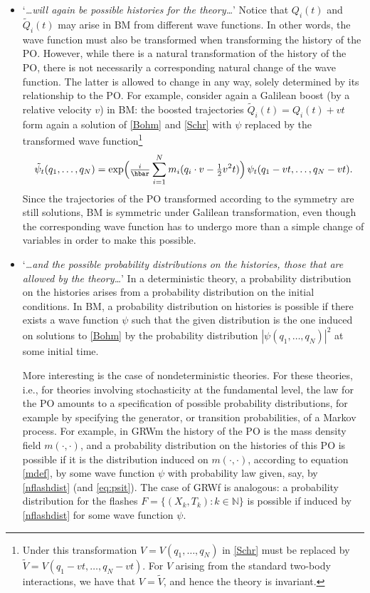 \documentclass[12pt]{article}
\newcommand{\NNN}{\mathbb{N}}
\begin{document}
\begin{itemize}
\item  `{\em \ldots  will again be possible histories for the theory\ldots}'
Notice that $Q_i(t)$ and $\tilde{Q}_i(t)$ may {arise in {\sf BM} from} different wave functions. In other words, the wave function must also be transformed when transforming the history of the PO.   However, while there is a natural transformation of  the history of the PO, there  is {not necessarily a} corresponding natural change of   the wave function.    The latter is  allowed to change  in any  way, solely determined by its relationship to the PO. {For example, consider} again a Galilean boost (by a relative velocity $v$) in {\sf BM}:
the boosted trajectories $\tilde{Q}_i(t) = Q_i(t) + v t$ form again a solution of \eqref{Bohm} and \eqref{Schr} with $\psi$ replaced by the transformed wave function\footnote{
Under this transformation $V=V(q_1, \ldots, q_N)$ in \eqref{Schr} must be replaced by $\tilde{V}=V(q_1-vt, \ldots, q_N-vt)$. For 
$V$ arising from the standard two-body interactions, {we have that $V=\tilde{V}$, and hence} the theory is invariant.}
\begin{equation}\label{Galilean}
  \tilde{\psi}_t(q_1, \ldots, q_N) = \exp\Bigl(\tfrac{i}{\hbar}
  \sum_{i=1}^N m_i
  (q_i \cdot v - \tfrac{1}{2} v^2 t)\Bigr) \, \psi_t(q_1-v t,
  \ldots, q_N-v t).
\end{equation}
Since the trajectories of the PO transformed according to the symmetry are still solutions, {\sf BM} is symmetric under Galilean transformation, even though the corresponding wave function has to undergo more than a simple change of variables in order to make this possible. 

\item `{\em \ldots and the possible probability distributions on the histories, those that are allowed by the theory\ldots}'
In a deterministic theory, {a probability distribution on the histories arises from a probability distribution on the initial conditions. In {\sf BM}, a probability distribution on histories is possible 
if there exists a wave function $\psi$ such that
the given distribution is the one induced on solutions to \eqref{Bohm} by the probability distribution $|\psi(q_1, \ldots, q_N)|^2$ at some initial time.}

More interesting is the case of nondeterministic theories. For these theories, i.e., for theories  involving stochasticity  at the fundamental level,  the law for the PO {amounts} to a specification of possible probability distributions, for example {by specifying the generator, or transition probabilities, of a Markov process.} 
For example, in  {\sf GRWm} the {history of the} PO is the mass density {field $m(\cdot, \cdot)$, and a probability distribution on the histories of this PO is possible if it is the distribution induced on $m(\cdot, \cdot)$,} according to equation \eqref{mdef},  {by some wave function $\psi$}  with probability law given, say, by \eqref{nflashdist} (and \eqref{eq:psit}). 
The case of {\sf GRWf} is analogous: {a probability distribution for the flashes 
$F=\{(X_k,T_k):k \in \NNN\}$ is possible if} induced by \eqref{nflashdist} for some wave function $\psi$.


\end{itemize}
\end{document}

